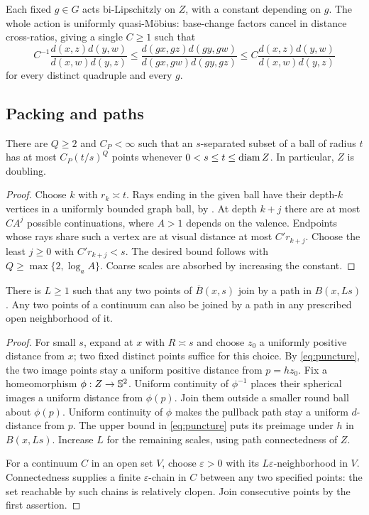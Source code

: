 Each fixed $g\in G$ acts bi-Lipschitzly on $Z$, with a constant
depending on $g$. The whole action is uniformly quasi-M\"obius:
base-change factors cancel in distance cross-ratios, giving a single
$C\ge1$ such that
\[
 C^{-1}\frac{d(x,z)d(y,w)}{d(x,w)d(y,z)}
 \le\frac{d(gx,gz)d(gy,gw)}{d(gx,gw)d(gy,gz)}
 \le C\frac{d(x,z)d(y,w)}{d(x,w)d(y,z)}
\]
for every distinct quadruple and every $g$.

\subsection{Packing and paths}

\begin{lemma}[Packing]
\label{lem:packing}
There are $Q\ge2$ and $C_P<\infty$ such that an $s$-separated subset
of a ball of radius $t$ has at most $C_P(t/s)^Q$ points whenever
$0<s\le t\le\operatorname{diam} Z$. In particular, $Z$ is doubling.
\end{lemma}
\begin{proof}
Choose $k$ with $r_k\asymp t$. Rays ending in the given ball have
their depth-$k$ vertices in a uniformly bounded graph ball, by
. At depth $k+j$ there are at most $CA^j$ possible
continuations, where $A>1$ depends on the valence. Endpoints whose
rays share such a vertex are at visual distance at most $C'r_{k+j}$.
Choose the least $j\ge0$ with $C'r_{k+j}<s$. The desired bound
follows with $Q\ge\max\{2,\log_a A\}$. Coarse scales are absorbed
by increasing the constant.
\end{proof}

\begin{lemma}
\label{lem:paths}
There is $L\ge1$ such that any two points of $\overline B(x,s)$
join by a path in $B(x,Ls)$. Any two points of a continuum can also
be joined by a path in any prescribed open neighborhood of it.
\end{lemma}
\begin{proof}
For small $s$, expand at $x$ with $R\asymp s$ and choose $z_0$ a
uniformly positive distance from $x$; two fixed distinct points
suffice for this choice. By \eqref{eq:puncture}, the two image
points stay a uniform positive distance from $p=hz_0$.
Fix a homeomorphism $\phi:Z\to\mathbb S^2$. Uniform continuity of
$\phi^{-1}$ places their spherical images a uniform distance from
$\phi(p)$. Join them outside a smaller round ball about $\phi(p)$.
Uniform continuity of $\phi$ makes the pullback path stay a uniform
$d$-distance from $p$. The upper bound in \eqref{eq:puncture}
puts its preimage under $h$ in $B(x,Ls)$. Increase $L$ for the
remaining scales, using path connectedness of $Z$.

For a continuum $C$ in an open set $V$, choose $\varepsilon>0$
with its $L\varepsilon$-neighborhood in $V$. Connectedness supplies
a finite $\varepsilon$-chain in $C$ between any two specified
points: the set reachable by such chains is relatively clopen.
Join consecutive points by the first assertion.
\end{proof}

